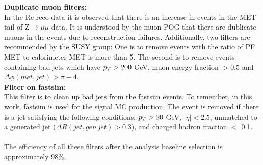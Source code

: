 \textbf{Duplicate muon filters:}\\
In the Re-reco data it is observed that there is an increase in events in the MET tail of Z$\rightarrow\mu\mu$ data. It is understood by the muon POG that there are dublicate muons in the events due to reconstruction failures. 
Additionally, two filters are recommended by the SUSY group:  
One is to remove events with the ratio of PF MET to calorimeter MET is more than 5.  The second is to remove events containing bad jets which have $p_T > 200$ GeV, muon energy fraction $>0.5$ and $\Delta\phi(met,jet)>\pi-4$.\\
\textbf{Filter on fastsim:}\\
This filter is to clean up bad jets from the fastsim events. To remember, in this work, fastsim is used for the signal MC production. The event is removed if there is a jet satisfying the following conditions:  $p_T > 20$ GeV, $|\eta|<2.5$, unmatched to a generated jet ($\Delta R(jet,gen\,jet)>0.3$), and charged hadron fraction $<$ 0.1.
\\
\\
The efficiency of all these filters after the analysis baseline selection is approximately 98\%.

